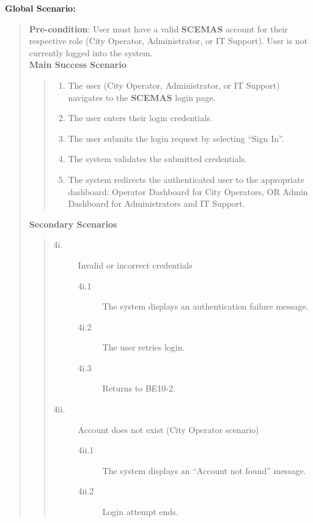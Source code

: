 \documentclass[]{article}
\begin{document}
\begin{enumerate}[{\bf BE10.}]
    {\bf Global Scenario:}
        \begin{quote}
            \textbf{Pre-condition}: User must have a valid \textbf{SCEMAS} account for their respective role (City Operator, Administrator, or IT Support). User is not currently logged into the system.\\
            \textbf{Main Success Scenario}
            \begin{quote}
                \begin{enumerate}[1.]
                    \item The user (City Operator, Administrator, or IT Support) navigates to the \textbf{SCEMAS} login page.
                    \item The user enters their login credentials.
                    \item The user submits the login request by selecting ``Sign In''.
                    \item The system validates the submitted credentials.
                    \item The system redirects the authenticated user to the appropriate dashboard: Operator Dashboard for City Operators, OR Admin Dashboard for Administrators and IT Support.
                \end{enumerate}
            \end{quote}
            \textbf{Secondary Scenarios}
            \begin{quote}
                \begin{description}
                    \item[\textmd{4i.}] Invalid or incorrect credentials
                    \begin{description}
                        \item[\textmd{4i.1}] The system displays an authentication failure message.
                        \item[\textmd{4i.2}] The user retries login.
                        \item[\textmd{4i.3}] Returns to BE10-2.
                    \end{description}

                    \item[\textmd{4ii.}] Account does not exist (City Operator scenario)
                    \begin{description}
                        \item[\textmd{4ii.1}] The system displays an ``Account not found'' message.
                        \item[\textmd{4ii.2}] Login attempt ends.
                    \end{description}


\end{description}
\end{quote}
\end{quote}
\end{enumerate}
\end{document}
